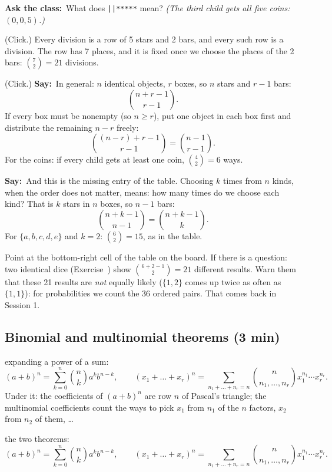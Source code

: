 \documentclass[11pt,a4paper,parskip=half]{scrartcl}
\newcommand{\say}{\textbf{\color{teal}Say:}\ }
\newcommand{\ask}{\textbf{\color{navy}Ask the class:}\ }
\begin{document}
\ask What does \texttt{||*****} mean? \emph{(The third child gets all five
coins: $(0,0,5)$.)}

(Click.) Every division is a row of 5 stars and 2 bars, and every such row
is a division. The row has 7 places, and it is fixed once we choose the
places of the 2 bars: $\binom72=21$ divisions.

(Click.) \say In general: $n$ identical objects, $r$ boxes, so $n$ stars
and $r-1$ bars:
\[ \binom{n+r-1}{r-1}. \]
If every box must be nonempty (so $n\ge r$), put one object in each box first and
distribute the remaining $n-r$ freely:
\[ \binom{(n-r)+r-1}{r-1}=\binom{n-1}{r-1}. \]
For the coins: if every child gets at least one coin, $\binom42=6$ ways.

\say And this is the missing entry of the table. Choosing $k$ times from $n$
kinds, when the order does not matter, means: how many times do we choose
each kind? That is $k$ stars in $n$ boxes, so $n-1$ bars:
\[ \binom{n+k-1}{n-1}=\binom{n+k-1}{k}. \]
For $\{a,b,c,d,e\}$ and $k=2$: $\binom62=15$, as in the table.

\begin{cue}
	Point at the bottom-right cell of the table on the board. If there is a
	question: two identical dice (Exercise~) show
	$\binom{6+2-1}{2}=21$ different results. Warn them that these 21 results
	are \emph{not} equally likely ($\{1,2\}$ comes up twice as often as
	$\{1,1\}$): for probabilities we count the 36 ordered pairs. That comes
	back in Session 1.
\end{cue}

\subsection{Binomial and multinomial theorems (3 min)}

\begin{onslide}
	expanding a power of a sum:
	\[ (a+b)^n=\sum_{k=0}^n\binom nk a^kb^{n-k},\qquad
		(x_1+\dots+x_r)^n=\sum_{n_1+\dots+n_r=n}\binom{n}{n_1,\dots,n_r}
		x_1^{n_1}\cdots x_r^{n_r}. \]
	Under it: the coefficients of $(a+b)^n$ are row $n$ of Pascal's
	triangle; the multinomial coefficients count the ways to pick $x_1$ from
	$n_1$ of the $n$ factors, $x_2$ from $n_2$ of them, \dots
\end{onslide}

\begin{printeq}
\begin{slidefig}
	the two theorems:
	\[ (a+b)^n=\sum_{k=0}^n\binom nk a^kb^{n-k},\qquad
		(x_1+\dots+x_r)^n=\sum_{n_1+\dots+n_r=n}\binom{n}{n_1,\dots,n_r}
		x_1^{n_1}\cdots x_r^{n_r}. \]
\end{slidefig}
\end{printeq}
\end{document}
